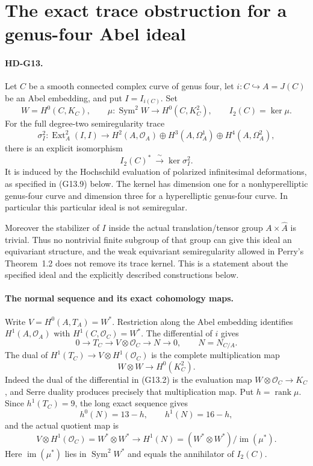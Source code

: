 \section{The exact trace obstruction for a genus-four Abel ideal}
\label{sec:genus4-trace}

\paragraph{HD-G13.}
Let $C$ be a smooth connected complex curve of genus four, let
$i:C\hookrightarrow A=J(C)$ be an Abel embedding, and put
$I=I_{i(C)}$. Set
\[
 W=H^0(C,K_C),\qquad
 \mu:\operatorname{Sym}^2W\longrightarrow H^0(C,K_C^2),
 \qquad I_2(C)=\ker\mu.
\]
For the full degree-two semiregularity trace
\[
 \sigma_I^2:\operatorname{Ext}^2_A(I,I)
   \longrightarrow
   H^2(A,\mathcal O_A)\oplus H^3(A,\Omega_A^1)
                         \oplus H^4(A,\Omega_A^2),
\]
there is an explicit isomorphism
\[
 \boxed{I_2(C)^*\ \xrightarrow{\ \sim\ }\ker\sigma_I^2.}
                                                               \tag{G13.1}
\]
It is induced by the Hochschild evaluation of polarized
infinitesimal deformations, as specified in (G13.9) below.
The kernel has dimension one for a nonhyperelliptic genus-four
curve and dimension three for a hyperelliptic genus-four curve.
In particular this particular ideal is not semiregular.

Moreover the stabilizer of $I$ inside the actual
translation/tensor group $A\times\widehat A$ is trivial.
Thus no nontrivial finite subgroup of that group can give this
ideal an equivariant structure, and the weak equivariant
semiregularity allowed in Perry's Theorem~1.2 does not remove
its trace kernel. This is a statement about the specified ideal
and the explicitly described constructions below.

\paragraph{The normal sequence and its exact cohomology maps.}
Write $V=H^0(A,T_A)=W^*$. Restriction along the Abel embedding
identifies $H^1(A,\mathcal O_A)$ with $H^1(C,\mathcal O_C)=W^*$.
The differential of $i$ gives
\[
 0\longrightarrow T_C\longrightarrow V\otimes\mathcal O_C
          \longrightarrow N\longrightarrow0,
 \qquad N=N_{C/A}.                                      \tag{G13.2}
\]
The dual of $H^1(T_C)\to V\otimes H^1(\mathcal O_C)$ is
the complete multiplication map
\[
 W\otimes W\longrightarrow H^0(K_C^2).
\]
Indeed the dual of the differential in (G13.2) is the evaluation
map $W\otimes\mathcal O_C\to K_C$, and Serre duality produces
precisely that multiplication map. Put $h=\operatorname{rank}\mu$.
Since $h^1(T_C)=9$, the long exact sequence gives
\[
 h^0(N)=13-h,\qquad h^1(N)=16-h,
\]
and the actual quotient map is
\[
 V\otimes H^1(\mathcal O_C)=W^*\otimes W^*
 \longrightarrow H^1(N)
  =(W^*\otimes W^*)/\operatorname{im}(\mu^*).             \tag{G13.3}
\]
Here $\operatorname{im}(\mu^*)$ lies in
$\operatorname{Sym}^2W^*$ and equals the annihilator of $I_2(C)$.

